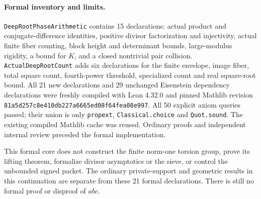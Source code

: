 \paragraph{Formal inventory and limits.}
\texttt{DeepRootPhase\allowbreak Arithmetic} contains 15 declarations:
actual product and conjugate-difference identities, positive divisor
factorization and injectivity, actual finite fiber counting, block
height and determinant bounds, large-modulus rigidity, a bound for
$K$, and a closed nontrivial pair collision.
\texttt{ActualDeepRoot\allowbreak Count} adds six declarations for the
finite envelope, image fiber, total square count, fourth-power threshold,
specialized count and real square-root bound. All 21 new declarations
and 29 unchanged Eisenstein dependency declarations were freshly compiled
with Lean 4.32.0 and pinned Mathlib revision
\texttt{81a5d257c8e410db227a6665ed08f64fea08e997}.
All 50 explicit axiom queries passed; their union is only
\texttt{propext}, \texttt{Classical.choice} and \texttt{Quot.sound}.
The existing compiled Mathlib cache was reused. Ordinary proofs and
independent internal review preceded the formal implementation.

This formal core does not construct the finite norm-one torsion group,
prove its lifting theorem, formalize divisor asymptotics or the sieve,
or control the unbounded signed packet. The ordinary private-support
and geometric results in this continuation are separate from these
21 formal declarations. There is still no formal proof or disproof of $abc$.

